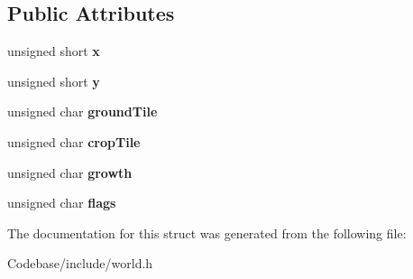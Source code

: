 \subsection*{Public Attributes}
\begin{DoxyCompactItemize}
\item 
\hypertarget{struct_block_a7373a8e929823422dfcd4985a154d445}{unsigned short {\bfseries x}}\label{struct_block_a7373a8e929823422dfcd4985a154d445}

\item 
\hypertarget{struct_block_af3d51fac75e91ac5ebf82acba62b5c1d}{unsigned short {\bfseries y}}\label{struct_block_af3d51fac75e91ac5ebf82acba62b5c1d}

\item 
\hypertarget{struct_block_a11fd4d71b43ede889013402709fbc1d0}{unsigned char {\bfseries ground\-Tile}}\label{struct_block_a11fd4d71b43ede889013402709fbc1d0}

\item 
\hypertarget{struct_block_a7b78a9d429e2cc849e2c48e0bd99206e}{unsigned char {\bfseries crop\-Tile}}\label{struct_block_a7b78a9d429e2cc849e2c48e0bd99206e}

\item 
\hypertarget{struct_block_a24f37e79d1ed8f7fa0e695ebfb098386}{unsigned char {\bfseries growth}}\label{struct_block_a24f37e79d1ed8f7fa0e695ebfb098386}

\item 
\hypertarget{struct_block_abe93c385392d2a1c5476b27377aa2e65}{unsigned char {\bfseries flags}}\label{struct_block_abe93c385392d2a1c5476b27377aa2e65}

\end{DoxyCompactItemize}


The documentation for this struct was generated from the following file\-:\begin{DoxyCompactItemize}
\item 
Codebase/include/world.\-h\end{DoxyCompactItemize}
